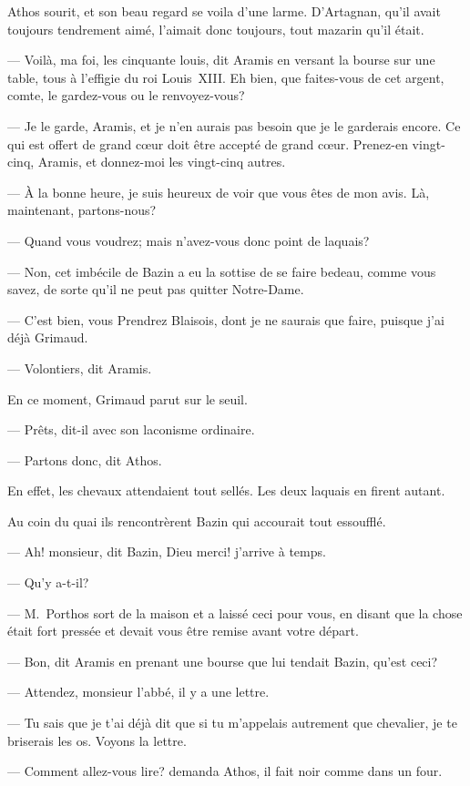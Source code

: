 Athos sourit, et son beau regard se voila d'une larme. D'Artagnan, qu'il avait toujours tendrement aimé, l'aimait donc toujours, tout mazarin qu'il était.

— Voilà, ma foi, les cinquante louis, dit Aramis en versant la bourse sur une table, tous à l'effigie du roi Louis~XIII. Eh bien, que faites-vous de cet argent, comte, le gardez-vous ou le renvoyez-vous?

— Je le garde, Aramis, et je n'en aurais pas besoin que je le garderais encore. Ce qui est offert de grand cœur doit être accepté de grand cœur. Prenez-en vingt-cinq, Aramis, et donnez-moi les vingt-cinq autres.

— À la bonne heure, je suis heureux de voir que vous êtes de mon avis. Là, maintenant, partons-nous?

— Quand vous voudrez; mais n'avez-vous donc point de laquais?

— Non, cet imbécile de Bazin a eu la sottise de se faire bedeau, comme vous savez, de sorte qu'il ne peut pas quitter Notre-Dame.

— C'est bien, vous Prendrez Blaisois, dont je ne saurais que faire, puisque j'ai déjà Grimaud.

— Volontiers, dit Aramis.

En ce moment, Grimaud parut sur le seuil.

— Prêts, dit-il avec son laconisme ordinaire.

— Partons donc, dit Athos.

En effet, les chevaux attendaient tout sellés. Les deux laquais en firent autant.

Au coin du quai ils rencontrèrent Bazin qui accourait tout essoufflé.

— Ah! monsieur, dit Bazin, Dieu merci! j'arrive à temps.

— Qu'y a-t-il?

— M.~Porthos sort de la maison et a laissé ceci pour vous, en disant que la chose était fort pressée et devait vous être remise avant votre départ.

— Bon, dit Aramis en prenant une bourse que lui tendait Bazin, qu'est ceci?

— Attendez, monsieur l'abbé, il y a une lettre.

— Tu sais que je t'ai déjà dit que si tu m'appelais autrement que chevalier, je te briserais les os. Voyons la lettre.

— Comment allez-vous lire? demanda Athos, il fait noir comme dans un four.

